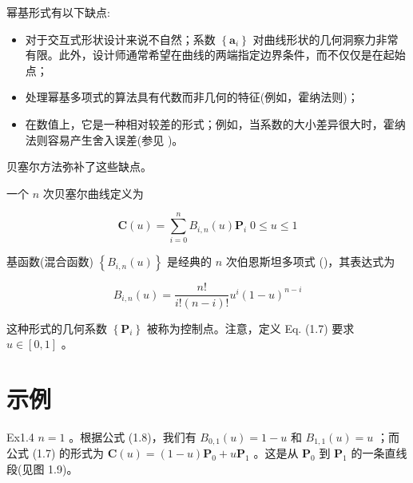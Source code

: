 \documentclass[../main.tex]{subfiles}
\begin{document}
幂基形式有以下缺点:

\begin{itemize}
\item 对于交互式形状设计来说不自然；系数 \(\left\{  {\mathbf{a}}_{i}\right\}\) 对曲线形状的几何洞察力非常有限。此外，设计师通常希望在曲线的两端指定边界条件，而不仅仅是在起始点；
\end{itemize}

\begin{itemize}
\item 处理幂基多项式的算法具有代数而非几何的特征(例如，霍纳法则)；
\end{itemize}

\begin{itemize}
\item 在数值上，它是一种相对较差的形式；例如，当系数的大小差异很大时，霍纳法则容易产生舍入误差(参见 \cite{Faro87,Faro88,Dani89})。
\end{itemize}

贝塞尔方法弥补了这些缺点。

一个 \(n\) 次贝塞尔曲线定义为

\[
\mathbf{C}\left( u\right)  = \mathop{\sum }\limits_{{i = 0}}^{n}{B}_{i,n}\left( u\right) {\mathbf{P}}_{i}\;0 \leq  u \leq  1 \tag{1.7}
\]



基函数(混合函数) \(\left\{  {{B}_{i,n}\left( u\right) }\right\}\) 是经典的 \(n\) 次伯恩斯坦多项式 (\cite{Bern12,Lore86})，其表达式为

\[
{B}_{i,n}\left( u\right)  = \frac{n!}{i!\left( {n - i}\right) !}{u}^{i}{\left( 1 - u\right) }^{n - i} \tag{1.8}
\]

这种形式的几何系数 \(\left\{  {\mathbf{P}}_{i}\right\}\) 被称为控制点。注意，定义 Eq. (1.7) 要求 \(u \in  \left\lbrack  {0,1}\right\rbrack\) 。

\section*{示例}

\noindent\begin{minipage}{\linewidth}
Ex1.4 \(n = 1\) 。根据公式 (1.8)，我们有 \({B}_{0,1}\left( u\right)  = 1 - u\) 和 \({B}_{1,1}\left( u\right)  = u\) ；而公式 (1.7) 的形式为 \(\mathbf{C}\left( u\right)  = \left( {1 - u}\right) {\mathbf{P}}_{0} + u{\mathbf{P}}_{1}\) 。这是从 \({\mathbf{P}}_{0}\) 到 \({\mathbf{P}}_{1}\) 的一条直线段(见图 1.9)。

\begin{center}
\begin{minipage}{6.5cm}
\centering
{}
\captionsetup{font=small,skip=6pt,justification=centering}
\end{minipage}
\end{center}
\end{minipage}
\par\medskip
\end{document}
